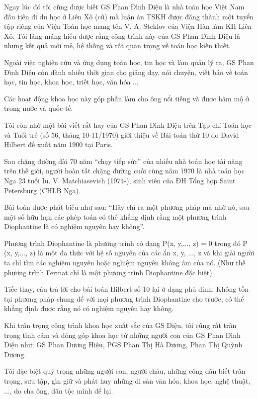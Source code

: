 Ngay lúc đó tôi cũng được biết GS Phan Đình Diệu là nhà toán học Việt Nam đầu tiên đi du học ở Liên Xô (cũ) mà luận án TSKH được đăng thành một tuyển tập riêng của Viện Toán học mang tên V. A. Steklov của Viện Hàn lâm KH Liên Xô. Tôi láng máng hiểu được rằng công trình này của GS Phan Đình Diệu là những kết quả mới mẻ, hệ thống và rất quan trọng về toán học kiến thiết.

Ngoài việc nghiên cứu và ứng dụng toán học, tin học và làm quản lý ra, GS Phan Đình Diệu còn dành nhiều thời gian cho giảng dạy, nói chuyện, viết báo về toán học, tin học, khoa học, triết học, văn hóa ...

Các hoạt động khoa học này góp phần làm cho ông nổi tiếng và được hâm mộ ở trong nước và quốc tế.

Tôi còn nhớ một bài viết rất hay của GS Phan Đình Diệu trên Tạp chí Toán học và Tuổi trẻ (số 56, tháng 10-11/1970) giới thiệu về Bài toán thứ 10 do David Hilbert đề xuất năm 1900 tại Paris.

Sau chặng đường dài 70 năm “chạy tiếp sức” của nhiều nhà toán học tài năng trên thế giới, người hoàn tất chặng đường cuối cùng năm 1970 là nhà toán học Nga 23 tuổi Iu. V. Matchiasevich (1974-), sinh viên của ĐH Tổng hợp Saint Petersburg (CHLB Nga).

Bài toán được phát biểu như sau: “Hãy chỉ ra một phương pháp mà nhờ nó, sau một số hữu hạn các phép toán có thể khẳng định rằng một phương trình Diophantine là có nghiệm nguyên hay không”.

Phương trình Diophantine là phương trình có dạng P(x, y,..., z) = 0 trong đó P (x, y,..., z) là một đa thức với hệ số nguyên của các ẩn x, y, ..., z và khi giải người ta chỉ tìm các nghiệm nguyên hoặc nghiệm nguyên không âm của nó. (Như thế phương trình Fermat chỉ là một phương trình Diophantine đặc biệt).

Tiếc thay, câu trả lời cho bài toán Hilbert số 10 lại ở dạng phủ định: Không tồn tại phương pháp chung để với mọi phương trình Diophantine cho trước, có thể khẳng định được rằng nó có nghiệm nguyên hay không.

Khi trân trọng công trình khoa học xuất sắc của GS Diệu, tôi cũng rất trân trọng tình cảm và đóng góp khoa học từ những người con của GS Phan Đình Diệu như: GS Phan Dương Hiệu, PGS Phan Thị Hà Dương, Phan Thị Quỳnh Dương.

Tôi đặc biệt quý trọng những người con, người cháu, những công dân biết trân trọng, sưu tập, gìn giữ và phát huy những di sản văn hóa, khoa học, nghệ thuật, ..., do cha ông, dân tộc mình để lại.

